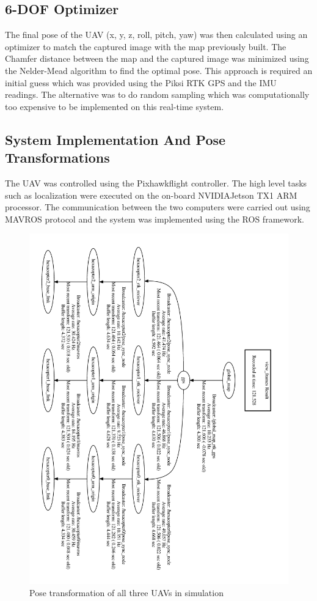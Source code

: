 \documentclass[12pt,a4paper]{report}
\begin{document}
\subsection{6-DOF Optimizer}
The final pose of the UAV (x, y, z, roll, pitch, yaw) was then calculated using an optimizer to match the captured image with the map previously built. The Chamfer distance between the map and the captured image was minimized using the Nelder-Mead algorithm \cite{nelder1965simplex} to find the optimal pose. This approach is required an initial guess which was provided using the Piksi RTK GPS and the IMU readings. The alternative was to do random sampling which was computationally too expensive to be implemented on this real-time system. 

\subsection{System Implementation And Pose Transformations}
The UAV was controlled using the Pixhawk\texttrademark flight controller. The high level tasks such as localization were executed on the on-board NVIDIA\texttrademark Jetson TX1 ARM processor. The communication between the two computers were carried out using MAVROS protocol and the system was implemented using the ROS framework.\par

\begin{figure}
	\centering
	\includegraphics[width=1\textwidth,clip=true,trim=17 50 5 17]{images/tf-frames.jpg}
	\caption{Pose transformation of all three UAVs in simulation\label{tf_3UAV}}
\end{figure}
\end{document}
